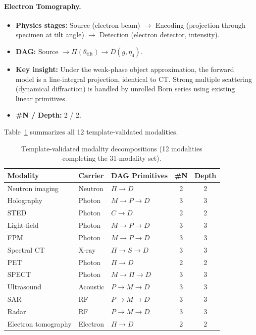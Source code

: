 \paragraph{Electron Tomography.}
\begin{itemize}
  \item \textbf{Physics stages:} Source (electron beam) $\to$ Encoding (projection through specimen at tilt angle) $\to$ Detection (electron detector, intensity).
  \item \textbf{DAG:} Source $\to \Pi(\theta_{\mathrm{tilt}}) \to D(g, \eta_4)$.
  \item \textbf{Key insight:} Under the weak-phase object approximation, the forward model is a line-integral projection, identical to CT. Strong multiple scattering (dynamical diffraction) is handled by unrolled Born series using existing linear primitives.
  \item \textbf{\#N / Depth:} 2 / 2.
\end{itemize}

\medskip

Table~\ref{tab:supp_template} summarizes all 12 template-validated modalities.

\begin{table}[htbp]
\centering
\caption{Template-validated modality decompositions (12 modalities completing the 31-modality set).} \label{tab:supp_template}
\begin{tabular}{l l l c c}
\toprule
\textbf{Modality} & \textbf{Carrier} & \textbf{DAG Primitives} & \textbf{\#N} & \textbf{Depth} \\
\midrule
Neutron imaging       & Neutron    & $\Pi \to D$                   & 2 & 2 \\
Holography            & Photon     & $M \to P \to D$               & 3 & 3 \\
STED                  & Photon     & $C \to D$                     & 2 & 2 \\
Light-field           & Photon     & $M \to P \to D$               & 3 & 3 \\
FPM                   & Photon     & $M \to P \to D$               & 3 & 3 \\
Spectral CT           & X-ray      & $\Pi \to S \to D$             & 3 & 3 \\
PET                   & Photon     & $\Pi \to D$                   & 2 & 2 \\
SPECT                 & Photon     & $M \to \Pi \to D$             & 3 & 3 \\
Ultrasound            & Acoustic   & $P \to M \to D$               & 3 & 3 \\
SAR                   & RF         & $P \to M \to D$               & 3 & 3 \\
Radar                 & RF         & $P \to M \to D$               & 3 & 3 \\
Electron tomography   & Electron   & $\Pi \to D$                   & 2 & 2 \\
\bottomrule
\end{tabular}
\end{table}

